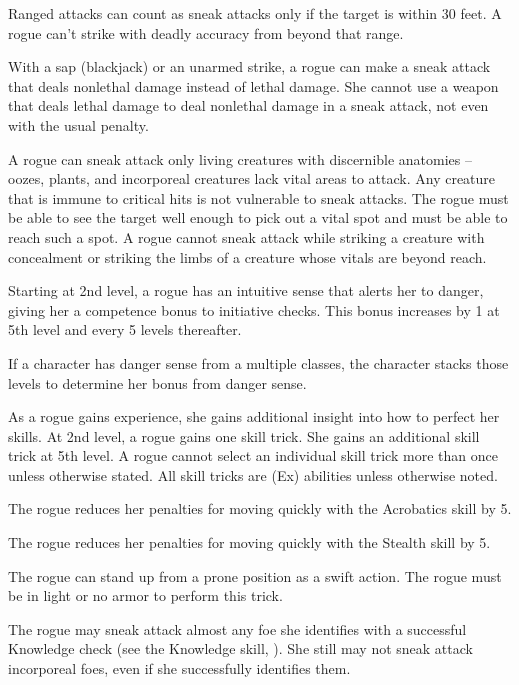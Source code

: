 \par Ranged attacks can count as sneak attacks only if the target is within 30 feet. A rogue can't strike with deadly accuracy from beyond that range.

With a sap (blackjack) or an unarmed strike, a rogue can make a sneak attack that deals nonlethal damage instead of lethal damage. She cannot use a weapon that deals lethal damage to deal nonlethal damage in a sneak attack, not even with the usual  penalty.

A rogue can sneak attack only living creatures with discernible anatomies -- oozes, plants, and incorporeal creatures lack vital areas to attack. Any creature that is immune to critical hits is not vulnerable to sneak attacks. The rogue must be able to see the target well enough to pick out a vital spot and must be able to reach such a spot. A rogue cannot sneak attack while striking a creature with concealment or striking the limbs of a creature whose vitals are beyond reach.

 Starting at 2nd level, a rogue has an intuitive sense that alerts her to danger, giving her a  competence bonus to initiative checks. This bonus increases by 1 at 5th level and every 5 levels thereafter.
\par If a character has danger sense from a multiple classes, the character stacks those levels to determine her bonus from danger sense.

 As a rogue gains experience, she gains additional insight into how to perfect her skills. At 2nd level, a rogue gains one skill trick. She gains an additional skill trick at 5th level. A rogue cannot select an individual skill trick more than once unless otherwise stated. All skill tricks are (Ex) abilities unless otherwise noted.

 The rogue reduces her penalties for moving quickly with the Acrobatics skill by 5.

 The rogue reduces her penalties for moving quickly with the Stealth skill by 5.

 The rogue can stand up from a prone position as a swift action. The rogue must be in light or no armor to perform this trick.

 The rogue may sneak attack almost any foe she identifies with a successful Knowledge check (see the Knowledge skill, ). She still may not sneak attack incorporeal foes, even if she successfully identifies them.

